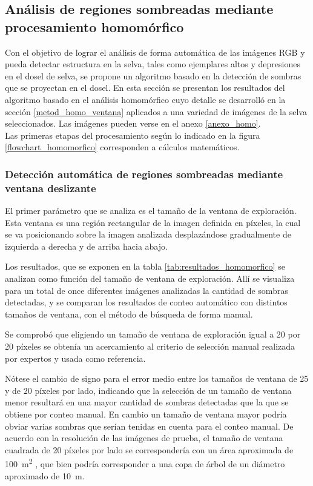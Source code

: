 \subsection{Análisis de regiones sombreadas mediante procesamiento homomórfico} \label{resultados homo}
Con el objetivo de lograr el análisis de forma automática de las imágenes RGB y pueda detectar estructura en la selva, tales como ejemplares altos y depresiones en el dosel de selva, se propone un algoritmo basado en la detección de sombras que se proyectan en el dosel. En esta sección se presentan los resultados del algoritmo basado en el análisis homomórfico cuyo detalle se desarrolló en la sección \ref{metod_homo_ventana} aplicados a una variedad de imágenes de la selva seleccionados. Las imágenes pueden verse en el anexo \ref{anexo_homo}.\\

Las primeras etapas del procesamiento según lo indicado en la figura \ref{flowchart_homomorfico} corresponden a cálculos matemáticos.
\subsubsection{Detección automática de regiones sombreadas mediante ventana deslizante} \label{resultados homo ventana}
El primer parámetro que se analiza es el tamaño de la ventana de exploración. Esta ventana es una región rectangular de la imagen definida en píxeles, la cual se va posicionando sobre la imagen analizada desplazándose gradualmente de izquierda a derecha y de arriba hacia abajo.

 Los resultados, que se exponen en la tabla \ref{tab:resultados_homomorfico} se analizan como función del tamaño de ventana de exploración.
Allí se visualiza para un total de once diferentes imágenes analizadas la cantidad de sombras detectadas, y se comparan los resultados de conteo automático con distintos tamaños de ventana, con el método de búsqueda de forma manual.

Se comprobó que eligiendo un tamaño de ventana de exploración igual a 20 por 20 píxeles se obtenía un acercamiento al criterio de selección manual realizada por expertos y usada como referencia.

Nótese el cambio de signo para el error medio entre los tamaños de ventana de 25 y de 20 píxeles por lado, indicando que la selección de un tamaño de ventana menor resultará en una mayor cantidad de sombras detectadas que la que se obtiene por conteo manual. En cambio un tamaño de ventana mayor podría obviar varias sombras que serían tenidas en cuenta para el conteo manual. De acuerdo con la resolución de las imágenes de prueba, el tamaño de ventana cuadrada de 20 píxeles por lado se correspondería con un área aproximada de \SI{100}{\metre\squared} , que bien podría corresponder a una copa de árbol de un diámetro aproximado de \SI{10}{\metre}.

